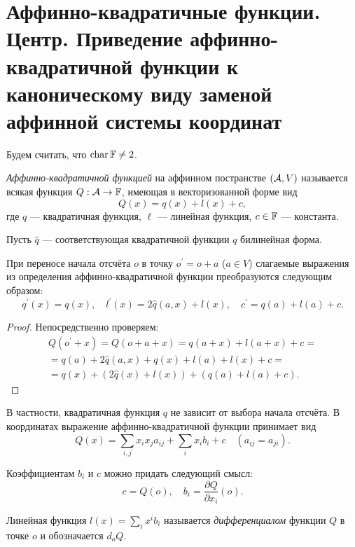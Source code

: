 \section{Аффинно-квадратичные функции. Центр. Приведение аффинно-квадратичной функции к каноническому виду заменой аффинной системы координат}

Будем считать, что $\operatorname{char}\mathbb{F} \ne 2$.

\begin{definition}
    \textit{Аффинно-квадратичной функцией} на аффинном постранстве $(\mathcal{A}, V)$ называется всякая функция $Q: \mathcal{A} \to \mathbb{F}$, имеющая в векторизованной форме вид
    \[
        Q(x) = q(x) + l(x) + c,
    \]
    где $q$ --- квадратичная функция, $\ell$ --- линейная функция, $c \in \mathbb{F}$ --- константа.
\end{definition}

Пусть $\widehat{q}$ --- соответствующая квадратичной функции $q$ билинейная форма.

\begin{lemma}
    При переносе начала отсчёта $o$ в точку $o^\prime = o + a$ ($a \in V$) слагаемые выражения из определения аффинно-квадратичной функции преобразуются следующим образом:
    \[
        q^\prime(x) = q(x),\quad l^\prime(x) = 2\widehat{q}(a, x) + l(x),\quad c^\prime = q(a) + l(a) + c.
    \]
\end{lemma}

\begin{proof}
    Непосредственно проверяем:
    \begin{multline*}
        Q(o^\prime + x) = Q(o + a + x) = q(a + x) + l(a + x) + c =\\ = q(a) + 2\widehat{q}(a, x) + q(x) + l(a) + l(x) + c =\\ = q(x) + (2\widehat{q}(x) + l(x)) + (q(a) + l(a) + c).
    \end{multline*}
\end{proof}

В частности, квадратичная функция $q$ не зависит от выбора начала отсчёта. В координатах выражение аффинно-квадратичной функции принимает вид
\[
    Q(x) = \sum_{i, j}x_ix_ja_{ij} + \sum_ix_ib_i + c\quad(a_{ij} = a_{ji}).
\]

Коэффициентам $b_i$ и $c$ можно придать следующий смысл:
\[
    c = Q(o),\quad b_i = \frac{\partial Q}{\partial x_i}(o).
\]

\begin{definition}
    Линейная функция $l(x) = \sum\limits_ix^ib_i$ называется \textit{дифференциалом} функции $Q$ в точке $o$ и обозначается $d_oQ$.
\end{definition}

